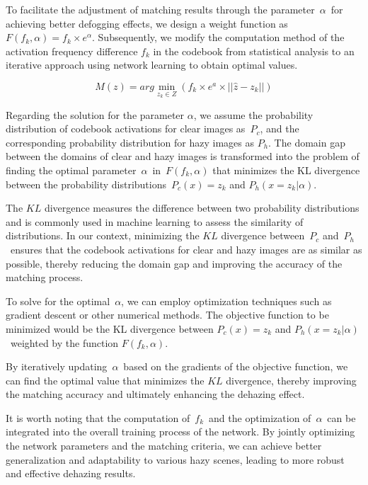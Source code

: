\documentclass[journal]{IEEEtran}
\begin{document}
To facilitate the adjustment of matching results through the parameter $\alpha$ for achieving better defogging effects, we design a weight function as $F(f_{k}, \alpha) = f_{k} \times e^{\alpha} $. Subsequently, we modify the computation method of the activation frequency difference $f_{k}$ in the codebook from statistical analysis to an iterative approach using network learning to obtain optimal values.

\begin{equation}
	\label{codebook_matching_equation_1}
	M(z) = arg \min_{z_{k} \in Z} (f_{k} \times e^{a} \times || \widehat{z} - z_{k} ||)
\end{equation}

Regarding the solution for the parameter $\alpha$, we assume the probability distribution of codebook activations for clear images as $P_{c}$, and the corresponding probability distribution for hazy images as $P_{h}$. The domain gap between the domains of clear and hazy images is transformed into the problem of finding the optimal parameter $\alpha$ in $F(f_{k}, \alpha)$ that minimizes the KL divergence between the probability distributions $P_{c}(x) = z_{k}$ and $P_{h}(x = z_{k} | \alpha) $.


The $KL$ divergence measures the difference between two probability distributions and is commonly used in machine learning to assess the similarity of distributions. In our context, minimizing the $KL$ divergence between $P_{c}$ and $P_{h}$ ensures that the codebook activations for clear and hazy images are as similar as possible, thereby reducing the domain gap and improving the accuracy of the matching process.

To solve for the optimal $\alpha$, we can employ optimization techniques such as gradient descent or other numerical methods. The objective function to be minimized would be the KL divergence between $P_{c}(x) = z_{k}$ and $P_{h}(x = z_{k} | \alpha) $ weighted by  the function $F(f_{k}, \alpha)$.

By iteratively updating $\alpha$ based on the gradients of the objective function, we can find the optimal value that minimizes the $KL$ divergence, thereby improving the matching accuracy and ultimately enhancing the dehazing effect.

It is worth noting that the computation of $f_{k}$ and the optimization of $\alpha$ can be integrated into the overall training process of the network. By jointly optimizing the network parameters and the matching criteria, we can achieve better generalization and adaptability to various hazy scenes, leading to more robust and effective dehazing results.
\end{document}
